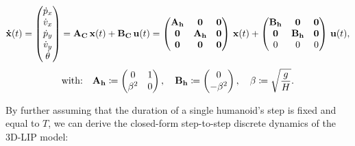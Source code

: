 \begin{equation} \notag
\mathbf{\dot{x}}(t) = 
\begin{pmatrix}
    \dot{p}_{x}\\
    \dot{v}_{x}\\
    \dot{p}_{y}\\
    \dot{v}_{y}\\
    \dot{\theta}
\end{pmatrix} =
\mathbf{A_C} \, \mathbf{x}(t) + \mathbf{B_C} \, \mathbf{u}(t) =
\begin{pmatrix}
    \mathbf{A_h} & \mathbf{0} & \mathbf{0} \\
    \mathbf{0} & \mathbf{A_h} & \mathbf{0} \\
    \mathbf{0} & \mathbf{0} & \mathbf{0} \\
\end{pmatrix} \, \mathbf{x}(t) +
\begin{pmatrix}
    \mathbf{B_h} & \mathbf{0} & \mathbf{0} \\
    \mathbf{0} & \mathbf{B_h} & \mathbf{0} \\
    0 & 0 & 0\\
\end{pmatrix} \, \mathbf{u}(t),
\end{equation}
\begin{equation} \notag
\text{with:}\quad
\mathbf{A_h} \coloneq
\begin{pmatrix}
    0 & 1 \\
    \beta^2 & 0
\end{pmatrix},
\quad
\mathbf{B_h} \coloneq
\begin{pmatrix}
    0 \\
    -\beta^2
\end{pmatrix}, \quad
\beta \coloneqq \sqrt{\frac{g}{H}}.
\end{equation}

By further assuming that the duration of a single humanoid's step is fixed and equal to $T$, we can derive the closed-form step-to-step discrete dynamics of the 3D-LIP model:

